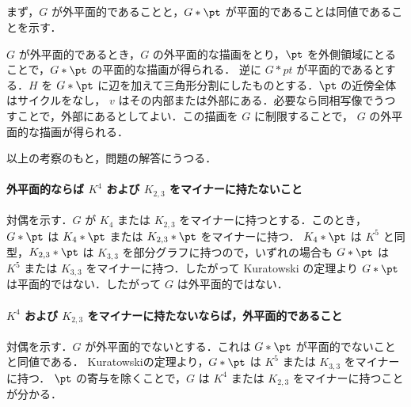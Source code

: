 \subsection{}
まず，$G$ が外平面的であることと，$G * \pt$ が平面的であることは同値であることを示す．

$G$ が外平面的であるとき，$G$ の外平面的な描画をとり，$\pt$ を外側領域にとることで，$G*\pt$ の平面的な描画が得られる．
逆に $G * pt$ が平面的であるとする．$H$ を $G * \pt$ に辺を加えて三角形分割にしたものとする．$\pt$ の近傍全体はサイクルをなし，
$v$ はその内部または外部にある．必要なら同相写像でうつすことで，外部にあるとしてよい．この描画を $G$ に制限することで，
$G$ の外平面的な描画が得られる．

以上の考察のもと，問題の解答にうつる．

\paragraph{外平面的ならば $K^4$ および $K_{2,3}$ をマイナーに持たないこと}
対偶を示す．$G$ が $K_4$ または $K_{2,3}$ をマイナーに持つとする．このとき，
$G * \pt$ は $K_4 * \pt$ または $K_{2,3} * \pt$ をマイナーに持つ．
$K_4 * \pt$ は $K^5$ と同型，$K_{2,3} * \pt$ は $K_{3,3}$ を部分グラフに持つので，いずれの場合も
$G * \pt$ は $K^5$ または $K_{3,3}$ をマイナーに持つ．したがって Kuratowski の定理より
$G * \pt$ は平面的ではない．したがって $G$ は外平面的ではない．

\paragraph{$K^4$ および $K_{2,3}$ をマイナーに持たないならば，外平面的であること}
対偶を示す．$G$ が外平面的でないとする．これは $G * \pt$ が平面的でないことと同値である．
Kuratowskiの定理より，$G * \pt$ は $K^5$ または $K_{3,3}$ をマイナーに持つ．
$\pt$ の寄与を除くことで，$G$ は $K^4$ または $K_{2,3}$ をマイナーに持つことが分かる．